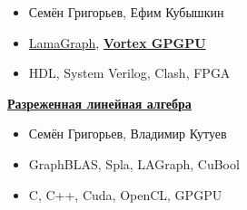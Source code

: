 \documentclass[xcolor=table,aspectratio=169]{beamer}
\begin{document}
\begin{frame}[fragile]
\begin{minipage}{0.48\textwidth}
{        \begin{itemize}\setlength\itemsep{-0.4em}
          \item Семён Григорьев, Ефим Кубышкин
          \item \href{https://github.com/Lamagraph}{LamaGraph}, \textbf{\href{https://github.com/vortexgpgpu/vortex}{Vortex GPGPU}}
          \item HDL, System Verilog, Clash, FPGA
        \end{itemize}
        }
        \underline{\textbf{\href{https://github.com/SparseLinearAlgebra}{Разреженная линейная алгебра}}}
        \small{
        \begin{itemize}\setlength\itemsep{-0.4em}
          \item Семён Григорьев, Владимир Кутуев
          \item GraphBLAS, Spla, LAGraph, CuBool
          \item C, C++, Cuda, OpenCL, GPGPU
        \end{itemize}
        }      
    \end{minipage}
    
\end{frame}
\end{document}
